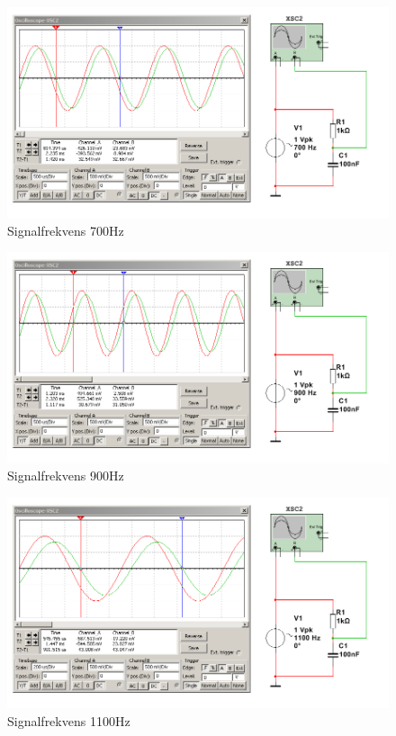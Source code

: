 \documentclass[11pt,a4paper]{article}
\begin{document}
\begin{figure}[H]
    \centering
    \includegraphics[scale=0.5]{ee466multisim/5-700Hz.png}
    \caption{Signalfrekvens 700Hz}
    \label{fig:sim-5-700Hz}
\end{figure}

\begin{figure}[H]
    \centering
    \includegraphics[scale=0.5]{ee466multisim/5-900Hz.png}
    \caption{Signalfrekvens 900Hz}
    \label{fig:sim-5-900Hz}
\end{figure}

\begin{figure}[H]
    \centering
    \includegraphics[scale=0.5]{ee466multisim/5-1100Hz.png}
    \caption{Signalfrekvens 1100Hz}
    \label{fig:sim-5-1100Hz}
\end{figure}
\end{document}

